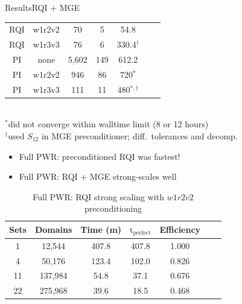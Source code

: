 \documentclass[final]{beamer}
\begin{document}
\begin{frame}{}
\begin{columns}[t]
\begin{column}{.3\linewidth}
\begin{block}{Results\textemdash RQI + MGE}
\begin{table}[h!]
\begin{tabular}{ c  c  c  c  c  c  c }
      RQI & \textcolor{dgreen}{w1r2v2} & 70    & 5   & \textcolor{dgreen}{54.8} \\
      RQI & w1r3v3 & 76    & 6   & 330.4$^{\dag}$ \\
      PI  & \textcolor{rawsienna}{none}   & 5,602 & 149 & \textcolor{rawsienna}{612.2} \\
      PI  & w1r2v2 & 946   & 86  & 720$^*$ \\
      PI  & w1r3v3 & 111   & 11  & 480$^{*,\dag}$ \\
      \hline
    \end{tabular}\\
    \footnotesize{$^{*}$did not converge within walltime limit (8 or 12 hours)\\
    $^{\dag}$used $S_{12}$ in MGE preconditioner; diff.\ tolerances and decomp.}\\
  \label{tab:PWR all}
\end{table}
%
	 \begin{itemize}
	 \item{Full PWR: preconditioned RQI was fastest!}
	 \item{Full PWR: RQI + MGE strong-scales well}
	 \end{itemize}
\vspace*{-0.3 em}
\begin{table}[h!]
  \caption{Full PWR: RQI strong scaling with $w1r2v2$ preconditioning}
  \begin{tabular}{ c  c  c  c  c  c  c }
     \hline
      Sets & Domains & Time (m) & $\text{t}_{\text{perfect}}$ & Efficiency \\
      \hline
      1   & 12,544 & 407.8 & 407.8 & 1.000 \\
      4   & 50,176 & 123.4 & 102.0 & 0.826\\
      11  & 137,984 & 54.8 & 37.1  & 0.676\\
      22  & 275,968 & 39.6 & 18.5  & 0.468\\
      \hline
  \end{tabular}
  \label{tab:PWR rqi strong scaling}
\end{table}

\end{block}
\end{column}
\end{columns}
\end{frame}
\end{document}
